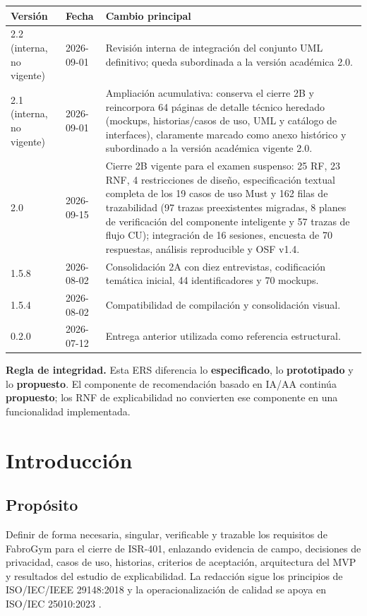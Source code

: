\documentclass[11pt,a4paper,twoside]{article}
\begin{document}
\begin{tabularx}{\textwidth}{p{2cm}p{2.4cm}X}\toprule
Versión & Fecha & Cambio principal \\ \midrule
2.2 (interna, no vigente) & 2026-09-01 & Revisión interna de integración del conjunto UML definitivo; queda subordinada a la versión académica 2.0.\\
2.1 (interna, no vigente) & 2026-09-01 & Ampliación acumulativa: conserva el cierre 2B y reincorpora 64 páginas de detalle técnico heredado (mockups, historias/casos de uso, UML y catálogo de interfaces), claramente marcado como anexo histórico y subordinado a la versión académica vigente 2.0.\\
2.0 & 2026-09-15 & Cierre 2B vigente para el examen suspenso: 25 RF, 23 RNF, 4 restricciones de diseño, especificación textual completa de los 19 casos de uso Must y 162 filas de trazabilidad (97 trazas preexistentes migradas, 8 planes de verificación del componente inteligente y 57 trazas de flujo CU); integración de 16 sesiones, encuesta de 70 respuestas, análisis reproducible y OSF v1.4.\\
1.5.8 & 2026-08-02 & Consolidación 2A con diez entrevistas, codificación temática inicial, 44 identificadores y 70 mockups.\\
1.5.4 & 2026-08-02 & Compatibilidad de compilación y consolidación visual.\\
0.2.0 & 2026-07-12 & Entrega anterior utilizada como referencia estructural.\\
\bottomrule\end{tabularx}

\begin{importantbox}
\textbf{Regla de integridad.} Esta ERS diferencia lo \textbf{especificado}, lo \textbf{prototipado} y lo \textbf{propuesto}. El componente de recomendación basado en IA/AA continúa \textbf{propuesto}; los RNF de explicabilidad no convierten ese componente en una funcionalidad implementada.
\end{importantbox}

\section{Introducción}
\subsection{Propósito}
Definir de forma necesaria, singular, verificable y trazable los requisitos de FabroGym para el cierre de ISR-401, enlazando evidencia de campo, decisiones de privacidad, casos de uso, historias, criterios de aceptación, arquitectura del MVP y resultados del estudio de explicabilidad. La redacción sigue los principios de ISO/IEC/IEEE 29148:2018 y la operacionalización de calidad se apoya en ISO/IEC 25010:2023 \cite{iso29148,iso25010,pohl2010,swebok2024}.
\end{document}
